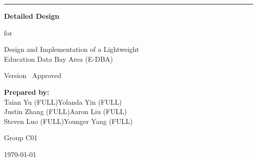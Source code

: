 \begin{flushright}
    \vspace*{1.5cm}
    \rule{0.75\textwidth}{5pt}
    
    \vspace{1.2cm}
    \fontsize{30}{28}\selectfont
    \textbf{Detailed Design}
    
    \vspace{1.5cm}
    \fontsize{14}{16}\selectfont
    for
    
    \vspace{1cm}
    \fontsize{18}{22}\selectfont
    Design and Implementation of a Lightweight \\[0.3em]
    Education Data Bay Area (E-DBA)
    
    \vspace{1.5cm}
    \fontsize{13}{15}\selectfont
    Version \myversion\ Approved
    
    \vspace{1.8cm}
    \begin{minipage}{0.7\textwidth}
    \flushright
    \fontsize{12}{14}\selectfont
    \textbf{Prepared by:} \\
    Taian Yu (FULL)\quad Yolanda Yin (FULL) \\
    Justin Zhang (FULL)\quad Aaron Liu (FULL) \\
    Steven Luo (FULL)\quad Younger Yang (FULL)
    \end{minipage}
    
    \vspace{1.2cm}
    \fontsize{14}{16}\selectfont
    Group C01
    
    \vspace{2cm}
    \today
\end{flushright}